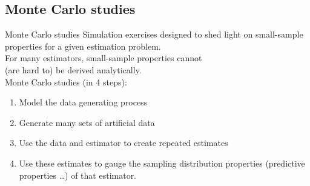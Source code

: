 \documentclass[usenames,dvipsnames]{beamer}
\begin{document}
\subsection{Monte Carlo studies}
\begin{frame}{Monte Carlo studies}
Simulation exercises designed to shed light on small-sample properties for a given estimation problem.\\
\smallskip
For many estimators, small-sample properties cannot \\(are hard to) be derived analytically.\\
\bigskip
Monte Carlo studies (in 4 steps):\\
\begin{enumerate}
\item Model the data generating process
\item Generate many sets of artificial data
\item Use the data and estimator to create repeated estimates
\item Use these estimates to gauge the sampling distribution properties (predictive properties \dots) of that estimator.
\end{enumerate}
\end{frame}
\end{document}
